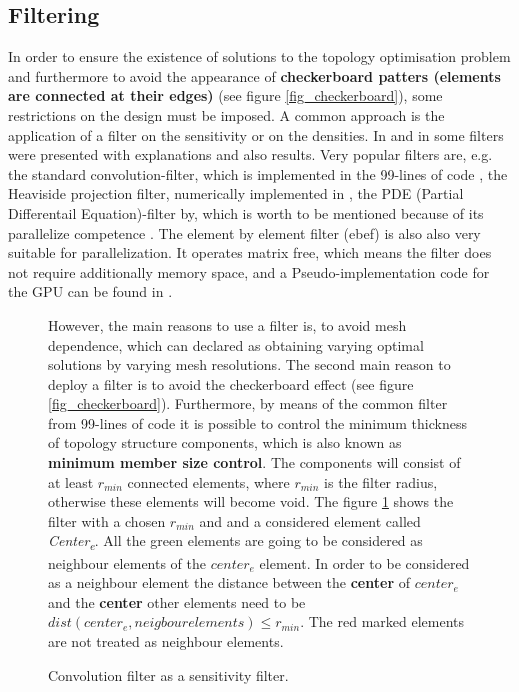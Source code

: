 \subsection{Filtering}
In order to ensure the existence of solutions to the topology optimisation problem and furthermore
to avoid the appearance of \textbf{checkerboard patters
 (elements are connected at their edges)} (see figure \ref{fig_checkerboard}), some restrictions on the design must
  be imposed. A common approach is the application of 
  a filter on the sensitivity or on the densities. In \cite{Sigmund.2007} and in \cite{Andreassen.2011} some filters were presented
   with explanations and also results. Very popular filters
    are, e.g. the standard convolution-filter, which is implemented in the 99-lines of code \cite{Sigmund.2001}, the Heaviside projection
     filter, numerically implemented in \cite{Andreassen.2011}, the PDE (Partial Differentail Equation)-filter by\cite{Lazarov.2011}, 
which is worth to be mentioned because of its 
parallelize competence . The element by element filter (ebef) is also also very suitable for parallelization. 
It operates matrix free, which means the filter does not require additionally memory space, and a Pseudo-implementation
 code for the GPU can be found in \cite{MartinezFrutos.2017}.\\
 	
 \begin{figure}[!h]
 \begin{minipage}{0.6 \textwidth}
   However, the main reasons to use a filter is, to avoid mesh 
 dependence, which can declared as obtaining varying optimal solutions by varying mesh resolutions. The second main reason to deploy a filter is to avoid the checkerboard effect (see figure \ref{fig_checkerboard}). 
 Furthermore, by means of the common filter from 99-lines of code \cite{Sigmund.2001} it is possible to 
 control the minimum 
 thickness of topology structure components, 
 which is also known as \textbf{minimum member size control}. 
 The components will consist of 
 at least \textbf{$r_{min}$} connected elements, where \textbf{$r_{min}$} is the filter radius, otherwise these elements will become void. The 
 figure \ref{fig_rmin} shows the filter with a chosen $r_{min}$ and
 and a considered element called \textit{Center\textsubscript{e}}.
 All the green elements are going to be considered as neighbour elements of the $center_e$ element. In order to be considered as a neighbour element
 the distance between the \textbf{center} of $center_e$
 and the \textbf{center} other elements need to 
 be $dist(center_e, neigbourelements) \leq r_{min}$. The red marked elements are 
 not treated as neighbour elements. \\
 \end{minipage}
 \hfill
 \begin{minipage}{0.35 \textwidth}
 	\centering
 \def\svgwidth{\textwidth}
  
 \caption{ Convolution filter as a sensitivity filter.} %
 \label{fig_rmin}   %
 \end{minipage}
  \end{figure}

